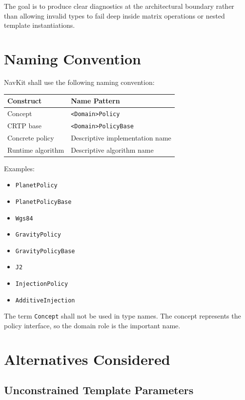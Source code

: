 \documentclass[11pt]{article}
\begin{document}
The goal is to produce clear diagnostics at the architectural boundary rather
than allowing invalid types to fail deep inside matrix operations or nested
template instantiations.

\section{Naming Convention}

NavKit shall use the following naming convention:

\begin{center}
\begin{tabular}{ll}
\toprule
\textbf{Construct} & \textbf{Name Pattern} \\
\midrule
Concept & \texttt{<Domain>Policy} \\
CRTP base & \texttt{<Domain>PolicyBase} \\
Concrete policy & Descriptive implementation name \\
Runtime algorithm & Descriptive algorithm name \\
\bottomrule
\end{tabular}
\end{center}

Examples:

\begin{itemize}
    \item \texttt{PlanetPolicy}
    \item \texttt{PlanetPolicyBase}
    \item \texttt{Wgs84}
    \item \texttt{GravityPolicy}
    \item \texttt{GravityPolicyBase}
    \item \texttt{J2}
    \item \texttt{InjectionPolicy}
    \item \texttt{AdditiveInjection}
\end{itemize}

The term \texttt{Concept} shall not be used in type names. The concept
represents the policy interface, so the domain role is the important name.

\section{Alternatives Considered}

\subsection{Unconstrained Template Parameters}
\end{document}
